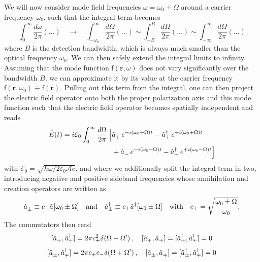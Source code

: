 We will now consider mode field frequencies $\omega = \omega_0 + \Omega$ around a carrier frequency $\omega_0$, such that the integral term becomes
\[
\int^{\infty}_0 \dfrac{d\omega}{2\pi}(...) \quad \to \quad \int_{-\omega_0}^{\infty} \dfrac{d\Omega}{2\pi}(...) \sim \int_{-B}^{B} \dfrac{d\Omega}{2\pi}(...) \sim \int_{-\infty}^{\infty} \dfrac{d\Omega}{2\pi}(...)
\]
where $B$ is the detection bandwidth, which is always much smaller than the optical frequency $\omega_0$. We can then safely extend the integral limits to infinity. Assuming that the mode function $\text{f}(\mathbf{r}, \omega)$ does not vary significantly over the bandwidth $B$, we can approximate it by its value at the carrier frequency $\text{f}(\mathbf{r}, \omega_0) \equiv \text{f}(\mathbf{r})$. Pulling out this term from the integral, one can then project the electric field operator onto both the proper polarization axis and this mode function such that the electric field operator becomes spatially independent and reads
\begin{equation}
  \begin{split}
\hat{E}(t) = i  \mathcal{E}_0 \int^{\infty}_0 \dfrac{d\Omega}{2\pi} \, \Big[&\hat{a}_+^{\vphantom{\dagger}}\,e^{-i(\omega_0 + \Omega )t}
- \hat{a}_+^{\dagger}\,e^{+i(\omega_0 + \Omega )t} \\
& + \hat{a}_-^{\vphantom{\dagger}}\,e^{-i(\omega_0 - \Omega )t}
- \hat{a}^{\dagger}_-\,e^{+i(\omega_0 - \Omega )t} \Big]
\end{split}
\end{equation}
with $\mathcal{E}_0 = \sqrt{\hbar \omega/2 \varepsilon_0 \mathcal{A} c}$, and where we additionally split the integral term in two, introducing negative and positive sideband frequencies whose annihilation and creation operators are written as
\[\hat{a}^{\vphantom{\dagger}}_{ \pm} \equiv c_\pm\hat{a}^{\vphantom{\dagger}}[\omega_0 \pm \Omega] \quad \text{and} \quad \hat{a}^\dagger_{ \pm} \equiv c_\pm \hat{a}^\dagger[\omega_0 \pm \Omega]\quad \text{with}\quad  c_\pm = \sqrt{\dfrac{\omega_0 \pm \Omega}{\omega_0}}.\]
The commutators then read
\[[\hat{a}_{\pm}^{\vphantom{\dagger}}, \hat{a}_{\pm}^\dagger] = 2 \pi c_\pm^2 \delta(\Omega - \Omega') \,, \quad
[\hat{a}_{\pm}^{\vphantom{\dagger}}, \hat{a}_{\pm}^{\vphantom{\dagger}} ] = [\hat{a}_{\pm}^\dagger, \hat{a}_{\pm}^\dagger] = 0\]
\[[\hat{a}_{\pm}^{\vphantom{\dagger}}, \hat{a}_{\mp}^\dagger] = 2 \pi c_+ c_- \delta(\Omega + \Omega') \,, \quad
[\hat{a}_{\pm}^{\vphantom{\dagger}}, \hat{a}_{\mp}^{\vphantom{\dagger}} ] = [\hat{a}_{\pm}^\dagger, \hat{a}_{\mp}^\dagger] = 0\]

